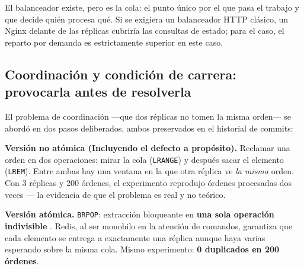 \documentclass[12pt,a4paper]{article}
\begin{document}
El balanceador existe, pero es la cola: el punto único por
el que pasa el trabajo y que decide quién procesa qué. Si se exigiera un
balanceador HTTP clásico, un Nginx delante de las réplicas cubriría las
consultas de estado; para el caso, el reparto por demanda es
estrictamente superior en este caso.

\subsection{Coordinación y condición de carrera: provocarla antes de resolverla}
\label{sec:carrera}

El problema de coordinación —que dos réplicas no tomen la misma orden— se
abordó en dos pasos deliberados, ambos preservados en el historial de commits:

\textbf{Versión no atómica (Incluyendo el defecto a propósito).} Reclamar
una orden en dos operaciones: mirar la cola (\texttt{LRANGE}) y después sacar
el elemento (\texttt{LREM}). Entre ambas hay una ventana en la que otra réplica ve
\emph{la misma} orden. Con 3 réplicas y 200 órdenes, el experimento reprodujo
órdenes procesadas dos veces — la evidencia de que el problema es real y no
teórico.

\textbf{Versión atómica.} \texttt{BRPOP}: extracción bloqueante en \textbf{una
sola operación indivisible} \cite{redis}. Redis, al ser monohilo en la atención
de comandos, garantiza que cada elemento se entrega a exactamente una réplica
aunque haya varias esperando sobre la misma cola. Mismo experimento:
\textbf{0 duplicados en 200 órdenes}.
\end{document}
